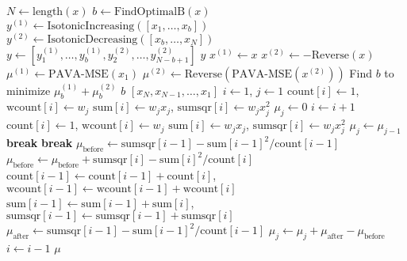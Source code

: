 \documentclass[10pt]{article}
\begin{document}
\begin{algorithm}
\caption{}
\begin{algorithmic}
	\State {}
	\State $N \gets \text{length}(x)$
	\State $b \gets \text{FindOptimalB}(x)$
	\State $y^{(1)} \gets \text{IsotonicIncreasing}([x_1,\dots,x_b])$
	\State $y^{(2)} \gets \text{IsotonicDecreasing}([x_b,\dots,x_N])$
	\State $y \gets [y^{(1)}_1,\dots,y^{(1)}_b,y^{(2)}_2,\dots,y^{(2)}_{N-b+1}]$
	\State \Return $y$
\EndFunction
\Statex
{}
	\Statex {}
	\State $x^{(1)} \gets x$
	\State $x^{(2)} \gets -\text{Reverse}(x)$
	\State $\mu^{(1)} \gets \text{PAVA-MSE}(x_1)$	
	\State $\mu^{(2)} \gets \text{Reverse}(\text{PAVA-MSE}(x^{(2)}))$
	\State Find $b$ to minimize $\mu^{(1)}_b+\mu^{(2)}_b$
	\State \Return $b$
\EndFunction
\Statex
{}
	\State {}
	\State \Return $[x_N,x_{N-1},\dots,x_1]$
\EndFunction
\Statex
{}          %
	\State {}
	\State $i \gets 1$, $j \gets 1$
	\State $\text{count}[i] \gets 1$, $\text{wcount}[i] \gets w_j$
	\State $\text{sum}[i] \gets w_j x_j$, $\text{sumsqr}[i] \gets w_j x_j^2$
	\State $\mu_j \gets 0$
	\State
		\State $i \gets i+1$
		\State $\text{count}[i] \gets 1$, $\text{wcount}[i] \gets w_j$
		\State $\text{sum}[i] \gets w_j x_j$, $\text{sumsqr}[i] \gets w_j x_j^2$
		\State $\mu_j \gets \mu_{j-1}$
		\Loop
				\textbf{ break} 
			\EndIf
				\textbf{ break} 
			\Else {}
				\State $\mu_{\text{before}}\gets\text{sumsqr}[i-1]-\text{sum}[i-1]^2/\text{count}[i-1]$
				\State $\mu_{\text{before}}\gets \mu_{\text{before}}+\text{sumsqr}[i]-\text{sum}[i]^2/\text{count}[i]$
				\State $\text{count}[i-1] \gets \text{count}[i-1]+\text{count}[i]$, $\text{wcount}[i-1] \gets \text{wcount}[i-1]+\text{wcount}[i]$
				\State $\text{sum}[i-1] \gets \text{sum}[i-1]+\text{sum}[i]$, $\text{sumsqr}[i-1] \gets \text{sumsqr}[i-1]+\text{sumsqr}[i]$
				\State $\mu_{\text{after}}\gets\text{sumsqr}[i-1]-\text{sum}[i-1]^2/\text{count}[i-1]$
				\State $\mu_j\gets \mu_j+\mu_{\text{after}}-\mu_{\text{before}}$
				\State $i\gets i-1$
			\EndIf
		\EndLoop
	\EndFor
	\State \Return $\mu$
\EndFunction

\end{algorithmic}
\label{alg:PAVA2}
\end{algorithm}
\end{document}
